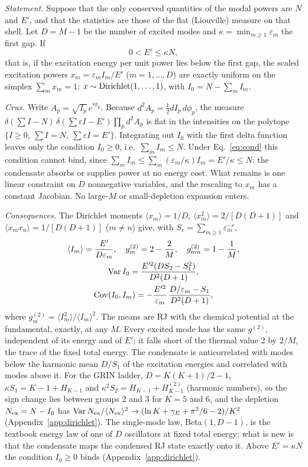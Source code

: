 \documentclass[aps,pra,twocolumn,superscriptaddress,nofootinbib,floatfix]{revtex4-2}
\begin{document}
\textit{Statement.} Suppose that the only conserved quantities of the modal powers are $N$ and $E'$, and that the
statistics are those of the flat (Liouville) measure on that shell. Let $D=M-1$ be the number of excited modes and
$\kappa=\min_{m\ge1}\varepsilon_m$ the first gap. If
\begin{equation}
0<E'\le\kappa N, \label{eq:cond}
\end{equation}
that is, if the excitation energy per unit power lies below the first gap, the scaled excitation powers
$x_m=\varepsilon_mI_m/E'$ ($m=1,\dots,D$) are exactly uniform on the simplex $\sum_mx_m=1$: $x\sim{\rm Dirichlet}(1,\dots,1)$,
with $I_0=N-\sum_mI_m$.

\textit{Crux.} Write $A_p=\sqrt{I_p}\,e^{i\phi_p}$. Because $d^2A_p=\tfrac12dI_p\,d\phi_p$, the measure
$\delta(\sum I-N)\,\delta(\sum\varepsilon I-E')\prod_pd^2A_p$ is flat in the intensities on the polytope
$\{I\ge0,\ \sum I=N,\ \sum\varepsilon I=E'\}$. Integrating out $I_0$ with the first delta function leaves only the
condition $I_0\ge0$, i.e.\ $\sum_mI_m\le N$. Under Eq.~\eqref{eq:cond} this condition cannot bind, since
$\sum_mI_m\le\sum_m(\varepsilon_m/\kappa)I_m=E'/\kappa\le N$: the condensate absorbs or supplies power at no energy cost.
What remains is one linear constraint on $D$ nonnegative variables, and the rescaling to $x_m$ has a constant Jacobian.
No large-$M$ or small-depletion expansion enters.

\textit{Consequences.} The Dirichlet moments $\langle x_m\rangle=1/D$, $\langle x_m^2\rangle=2/[D(D+1)]$ and
$\langle x_mx_n\rangle=1/[D(D+1)]$ ($m\ne n$) give, with $S_r=\sum_{m\ge1}\varepsilon_m^{-r}$,
\begin{gather}
\langle I_m\rangle=\frac{E'}{D\varepsilon_m},\quad g^{(2)}_m=2-\frac{2}{M},\quad g^{(2)}_{mn}=1-\frac1M,\label{eq:g2}\\
{\rm Var}\,I_0=\frac{E'^2(DS_2-S_1^2)}{D^2(D+1)},\label{eq:var}\\
{\rm Cov}(I_0,I_m)=-\frac{E'^2}{\varepsilon_m}\,\frac{D/\varepsilon_m-S_1}{D^2(D+1)} ,\label{eq:cov}
\end{gather}
where $g^{(2)}_m=\langle I_m^2\rangle/\langle I_m\rangle^2$. The means are RJ with the chemical potential at the
fundamental, exactly, at any $M$. Every excited mode has the same $g^{(2)}$, independent of its energy and of $E'$; it
falls short of the thermal value 2 by $2/M$, the trace of the fixed total energy. The condensate is anticorrelated with
modes below the harmonic mean $D/S_1$ of the excitation energies and correlated with modes above it. For the GRIN ladder,
$D=K(K+1)/2-1$, $\kappa S_1=K-1+H_{K-1}$ and $\kappa^2S_2=H_{K-1}+H^{(2)}_{K-1}$ (harmonic numbers), so the sign change
lies between groups 2 and 3 for $K=5$ and 6, and the depletion $N_{\rm ex}=N-I_0$ has
${\rm Var}\,N_{\rm ex}/\langle N_{\rm ex}\rangle^2\to(\ln K+\gamma_E+\pi^2/6-2)/K^2$ (Appendix~\ref{app:dirichlet}). The
single-mode law, Beta$(1,D-1)$, is the textbook energy law of one of $D$ oscillators at fixed total energy; what is new is
that the condensate maps the condensed RJ state exactly onto it. Above $E'=\kappa N$ the condition $I_0\ge0$ binds
(Appendix~\ref{app:dirichlet}).
\end{document}
